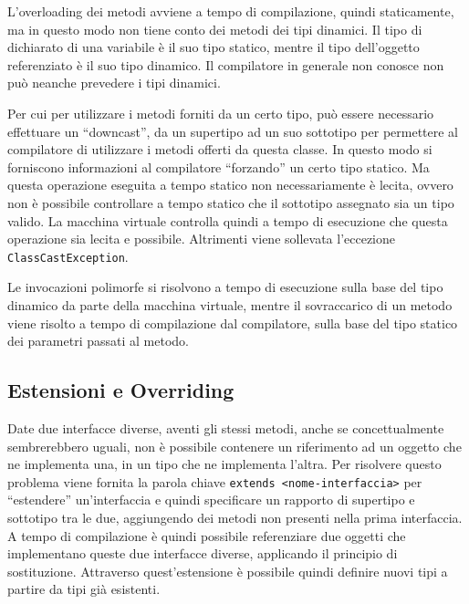 \documentclass{article}
\numberwithin{equation}{subsection}
\begin{document}
L'overloading dei metodi avviene a tempo di compilazione, quindi staticamente, ma in questo modo non tiene conto dei metodi dei tipi dinamici. 
Il tipo di dichiarato di una variabile è il suo tipo statico, mentre il tipo dell'oggetto referenziato è il suo tipo dinamico. Il compilatore in generale non conosce non può neanche prevedere 
i tipi dinamici. 

Per cui per utilizzare i metodi forniti da un certo tipo, può essere necessario effettuare un ``downcast'', da un supertipo ad un suo sottotipo per permettere al compilatore di utilizzare 
i metodi offerti da questa classe. In questo modo si forniscono informazioni al compilatore ``forzando'' un certo tipo statico. Ma questa operazione eseguita a tempo statico non necessariamente 
è lecita, ovvero non è possibile controllare a tempo statico che il sottotipo assegnato sia un tipo valido. La macchina virtuale controlla quindi a tempo di esecuzione che questa operazione 
sia lecita e possibile. Altrimenti viene sollevata l'eccezione \verb|ClassCastException|. 


Le invocazioni polimorfe si risolvono a tempo di esecuzione sulla base del tipo dinamico da parte della macchina virtuale, mentre il sovraccarico di un metodo viene risolto a tempo di 
compilazione dal compilatore, sulla base del tipo statico dei parametri passati al metodo. 

\subsection{Estensioni e Overriding}

Date due interfacce diverse, aventi gli stessi metodi, anche se concettualmente sembrerebbero uguali, non è possibile contenere un riferimento ad un oggetto che ne implementa una, in un 
tipo che ne implementa l'altra. Per risolvere questo problema viene fornita la parola chiave \verb|extends <nome-interfaccia>| per ``estendere'' un'interfaccia e quindi 
specificare un rapporto di supertipo e sottotipo tra le due, aggiungendo dei metodi non presenti nella prima interfaccia. A tempo di compilazione è quindi possibile 
referenziare due oggetti che implementano queste due interfacce diverse, applicando il principio di sostituzione. 
Attraverso quest'estensione è possibile quindi definire nuovi tipi a partire da tipi già esistenti. 
\end{document}
